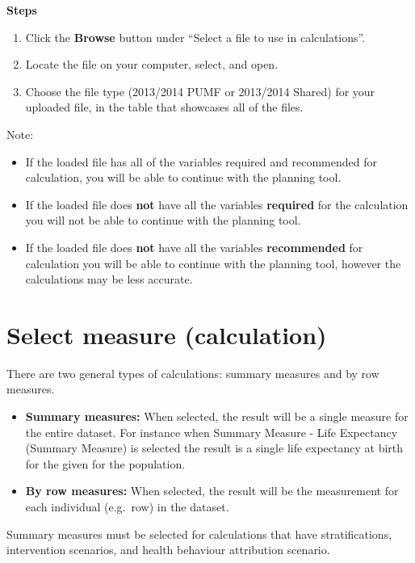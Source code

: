 \documentclass[]{book}
\begin{document}
\textbf{Steps}

\begin{enumerate}
\def\labelenumi{\arabic{enumi}.}
\item
  Click the \textbf{Browse} button under ``Select a file to use in calculations''.
\item
  Locate the file on your computer, select, and open.
\item
  Choose the file type (2013/2014 PUMF or 2013/2014 Shared) for your uploaded file, in the table that showcases all of the files.
\end{enumerate}

Note:

\begin{itemize}
\item
  If the loaded file has all of the variables required and recommended for calculation, you will be able to continue with the planning tool.
\item
  If the loaded file does \textbf{not} have all the variables \textbf{required} for the calculation you will not be able to continue with the planning tool.
\item
  If the loaded file does \textbf{not} have all the variables \textbf{recommended} for calculation you will be able to continue with the planning tool, however the calculations may be less accurate.
\end{itemize}

\hypertarget{select-measure-calculation}{%
\section{Select measure (calculation)}\label{select-measure-calculation}}

There are two general types of calculations: summary measures and by row measures.

\begin{itemize}
\item
  \textbf{Summary measures:} When selected, the result will be a single measure for the entire dataset. For instance when Summary Measure - Life Expectancy (Summary Measure) is selected the result is a single life expectancy at birth for the given for the population.
\item
  \textbf{By row measures:} When selected, the result will be the measurement for each individual (e.g.~row) in the dataset.
\end{itemize}

Summary measures must be selected for calculations that have stratifications, intervention scenarios, and health behaviour attribution scenario.
\end{document}
